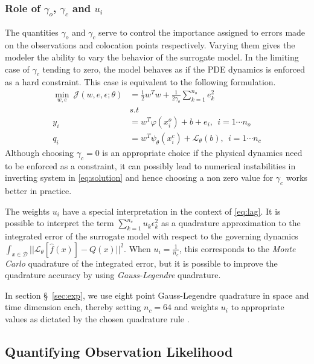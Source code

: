 \subsubsection*{Role of $\gamma_o$, $\gamma_c$ and $u_i$}

The quantities $\gamma_o$ and $\gamma_c$ serve to control the importance assigned to errors made 
on the observations and colocation points respectively. Varying them gives the modeler the ability 
to vary the behavior of the surrogate model. In the limiting case of $\gamma_c$ tending to zero, 
the model behaves as if the PDE dynamics is enforced as a hard constraint. This case is equivalent 
to the following formulation.
%
\begin{equation}\label{eq:surrogate2}
   \begin{aligned}
    \min_{w,e} \ \mathcal{J}(w,e,\epsilon;\theta) &= 
    \frac{1}{2} w^{T}w + \frac{1}{2\gamma_{o}} \sum_{k = 1}^{n_{o}}{e^{2}_{k}} \\
    & s.t \\
    y_{i} & = w^{T}\varphi(x^{o}_{i}) + b + e_{i}, \ \ i = 1 \cdots n_{o} \\
    q_{i} & = w^{T}\psi_{\theta}(x^{c}_{i}) + \mathcal{L}_{\theta}(b), \ \ i = 1 \cdots n_{c}
   \end{aligned}
\end{equation}
%
Although choosing $\gamma_c = 0$ is an appropriate choice if the physical dynamics need to be 
enforced as a constraint, it can possibly lead to numerical instabilities in inverting system in 
\cref{eq:solution} and hence choosing a non zero value for $\gamma_c$ works better in practice. 

The weights $u_i$ have a special interpretation in the context of \cref{eq:lag}. It is possible to
interpret the term $\sum_{k = 1}^{n_{c}}{u_{k} \epsilon^{2}_{k}}$ as a quadrature approximation
to the integrated error of the surrogate model with respect to the governing dynamics 
$\int_{x \in \mathcal{D}}{||\mathcal{L}_{\theta} [\hat{f}(x)] - Q(x)||^2}$. When 
$u_i = \frac{1}{n_c}$, this corresponds to the \emph{Monte Carlo} quadrature of the integrated 
error, but it is possible to improve the quadrature accuracy by using \emph{Gauss-Legendre} 
quadrature.

In section \S~\ref{sec:exp}, we use eight point Gauss-Legendre quadrature in space and time 
dimension each, thereby setting $n_c = 64$ and weights $u_i$ to appropriate values as dictated by 
the chosen quadrature rule \citep{_abramowitzm}.

\subsection{Quantifying Observation Likelihood}

